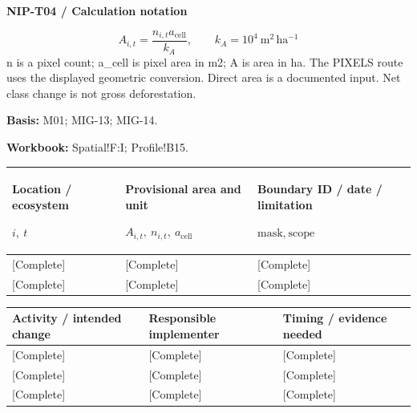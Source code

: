 \par\begingroup\sffamily\fontsize{8}{10}\selectfont\color{NEBGreen}\setlength{\parskip}{2pt}\setlength{\abovedisplayskip}{4pt}\setlength{\belowdisplayskip}{4pt}\setlength{\abovedisplayshortskip}{2pt}\setlength{\belowdisplayshortskip}{3pt}
\textbf{NIP-T04 / Calculation notation}\par
{\fontsize{9}{11}\selectfont\[ A_{i,t}=\frac{n_{i,t}a_{\mathrm{cell}}}{k_A},\qquad k_A=10^4\ \mathrm{m^2\,ha^{-1}} \]}
n is a pixel count; a\_cell is pixel area in m2; A is area in ha. The PIXELS route uses the displayed geometric conversion. Direct area is a documented input. Net class change is not gross deforestation.\par
\textbf{Basis:} M01; MIG-13; MIG-14.\par
\textbf{Workbook:} Spatial!F:I; Profile!B15.\par\endgroup
{\sffamily\fontsize{8.3}{10.3}\selectfont\begin{longtable}{@{}P{52.79mm} P{41.24mm} P{70.94mm}@{}}
\toprule
\textbf{Location / ecosystem}\par {\normalfont\fontsize{8.2}{10}\selectfont $i,\ t$} & \textbf{Provisional area and unit}\par {\normalfont\fontsize{8.2}{10}\selectfont $A_{i,t},\ n_{i,t},\ a_{\mathrm{cell}}$} & \textbf{Boundary ID / date / limitation}\par {\normalfont\fontsize{8.2}{10}\selectfont $\text{mask},\ \text{scope}$}\\\midrule\endhead
\rule{0pt}{7.7mm}[Complete] & [Complete] & [Complete]\\\hline
\rule{0pt}{7.7mm}[Complete] & [Complete] & [Complete]\\\hline
\end{longtable}}
\ProjectMapBox
{}
{\sffamily\fontsize{8.3}{10.3}\selectfont\begin{longtable}{@{}P{70.94mm} P{44.54mm} P{49.49mm}@{}}
\toprule
\textbf{Activity / intended change} & \textbf{Responsible implementer} & \textbf{Timing / evidence needed}\\\midrule\endhead
\rule{0pt}{7.7mm}[Complete] & [Complete] & [Complete]\\\hline
\rule{0pt}{7.7mm}[Complete] & [Complete] & [Complete]\\\hline
\rule{0pt}{7.7mm}[Complete] & [Complete] & [Complete]\\\hline
\end{longtable}}
